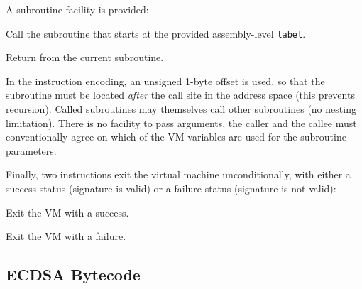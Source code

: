 \documentclass{llncs}
\begin{document}
A subroutine facility is provided:
\begin{codedesc3}

    \item[\_CALL label] Call the subroutine that starts at the provided
    assembly-level \verb+label+.

    \item[\_RET] Return from the current subroutine.

\end{codedesc3}
In the instruction encoding, an unsigned 1-byte offset is used, so that
the subroutine must be located \emph{after} the call site in the address
space (this prevents recursion). Called subroutines may themselves call
other subroutines (no nesting limitation). There is no facility to pass
arguments, the caller and the callee must conventionally agree on which
of the VM variables are used for the subroutine parameters.

Finally, two instructions exit the virtual machine unconditionally,
with either a success status (signature is valid) or a failure status
(signature is not valid):
\begin{codedesc3}

    \item[\_OK] Exit the VM with a success.

    \item[\_FAIL] Exit the VM with a failure.

\end{codedesc3}

\subsection{ECDSA Bytecode}
\end{document}
